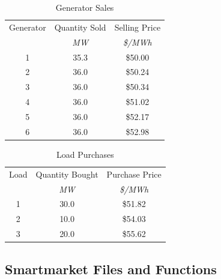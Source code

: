 \documentclass[12pt]{article}
\numberwithin{equation}{section}
\numberwithin{table}{section}
\numberwithin{figure}{section}
\begin{document}
\begin{appendices}
\begin{table}[!ht]
\centering
\begin{threeparttable}
\caption{Generator Sales}
\label{tab:sales}
\footnotesize
\begin{tabular}{ccc}
\toprule
Generator & Quantity Sold & Selling Price \\
 & {\footnotesize \it MW} & {\footnotesize \it \$/MWh} \\
\midrule
1	& 35.3	& \$50.00 \\
2	& 36.0	& \$50.24 \\
3	& 36.0	& \$50.34 \\
4	& 36.0	& \$51.02 \\
5	& 36.0	& \$52.17 \\
6	& 36.0	& \$52.98 \\
\bottomrule
\end{tabular}
\end{threeparttable}
\end{table}

\begin{table}[!ht]
\centering
\begin{threeparttable}
\caption{Load Purchases}
\label{tab:purchases}
\footnotesize
\begin{tabular}{ccc}
\toprule
Load & Quantity Bought & Purchase Price \\
 & {\footnotesize \it MW} & {\footnotesize \it \$/MWh} \\
\midrule
1	& 30.0	& \$51.82 \\
2	& 10.0	& \$54.03 \\
3	& 20.0	& \$55.62 \\
\bottomrule
\end{tabular}
\end{threeparttable}
\end{table}

\clearpage
\subsection{Smartmarket Files and Functions}


\end{appendices}
\end{document}
